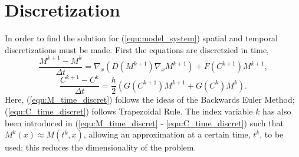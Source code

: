 \section{Discretization}

In order to find the solution for (\ref{equ:model_system}) spatial and temporal discretizations must be made.
First the equations are discretzied in time, 
\begin{equation} \label{equ:M_time_discret}
  \frac{M^{k+1} - M^{k}}{\Delta t} = \nabla_x (D(M^{k+1}) \nabla_x M^{k+1}) + F(C^{k+1}) M^{k+1},
\end{equation}
\begin{equation} \label{equ:C_time_discret}
  \frac{C^{k+1} - C^{k}}{\Delta t} = \frac{h}{2} ( G(C^{k+1}) M^{k+1} + G(C^{k}) M^{k} ).
\end{equation}
Here, (\ref{equ:M_time_discret}) follows the ideas of the Backwards Euler Method; (\ref{equ:C_time_discret}) follows Trapezoidal Rule. 
The index variable $k$ has also been introduced in (\ref{equ:M_time_discret} - \ref{equ:C_time_discret}) such that $M^{k}(x) \approx M(t^{k}, x)$, allowing an approximation at a certain time, $t^{k}$, to be used; this reduces the dimensionality of the problem. 

